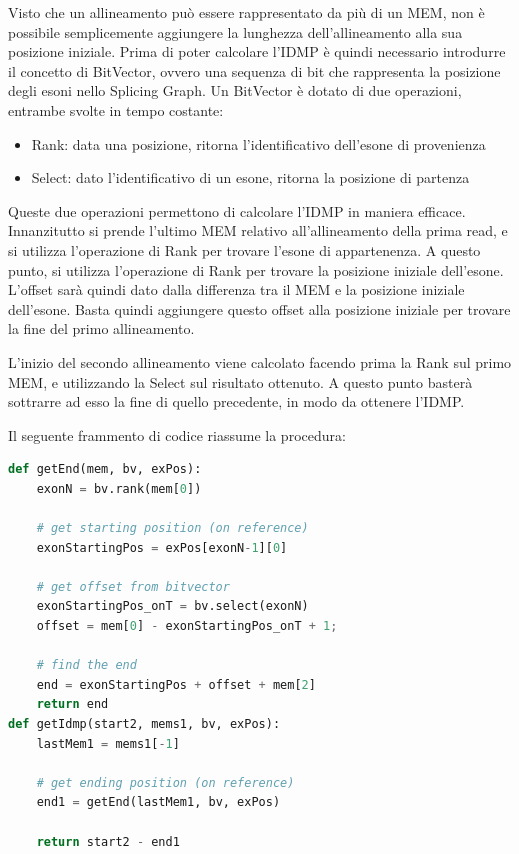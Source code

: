 Visto che un allineamento può essere rappresentato da più di un MEM, non è possibile semplicemente aggiungere la lunghezza dell'allineamento alla sua posizione iniziale. Prima di poter calcolare l'IDMP è quindi necessario introdurre il concetto di BitVector, ovvero una sequenza di bit che rappresenta la posizione degli esoni nello Splicing Graph. Un BitVector è dotato di due operazioni, entrambe svolte in tempo costante:

\begin{itemize}
	\item Rank: data una posizione, ritorna l'identificativo dell'esone di provenienza
	\item Select: dato l'identificativo di un esone, ritorna la posizione di partenza 
\end{itemize}

Queste due operazioni permettono di calcolare l'IDMP in maniera efficace. Innanzitutto si prende l'ultimo MEM relativo all'allineamento della prima read, e si utilizza l'operazione di Rank per trovare l'esone di appartenenza. A questo punto, si utilizza l'operazione di Rank per trovare la posizione iniziale dell'esone. L'offset sarà quindi dato dalla differenza tra il MEM e la posizione iniziale dell'esone. Basta quindi aggiungere questo offset alla posizione iniziale per trovare la fine del primo allineamento.

L'inizio del secondo allineamento viene calcolato facendo prima la Rank sul primo MEM, e utilizzando la Select sul risultato ottenuto. A questo punto basterà sottrarre ad esso la fine di quello precedente, in modo da ottenere l'IDMP.

Il seguente frammento di codice riassume la procedura:
\medskip
\begin{lstlisting}[language=Python]
def getEnd(mem, bv, exPos):
    exonN = bv.rank(mem[0])

    # get starting position (on reference)
    exonStartingPos = exPos[exonN-1][0]

    # get offset from bitvector
    exonStartingPos_onT = bv.select(exonN)
    offset = mem[0] - exonStartingPos_onT + 1;

    # find the end
    end = exonStartingPos + offset + mem[2]
    return end
def getIdmp(start2, mems1, bv, exPos):
    lastMem1 = mems1[-1]

    # get ending position (on reference)
    end1 = getEnd(lastMem1, bv, exPos)

    return start2 - end1
\end{lstlisting}

